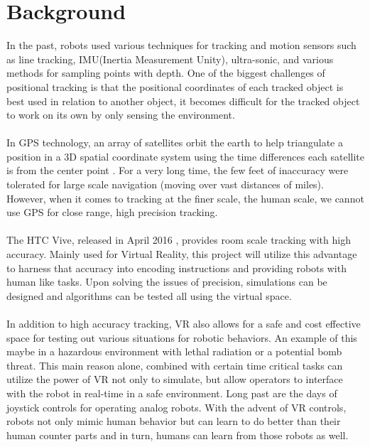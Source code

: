 \documentclass[10pt,a4paper]{article}
\begin{document}
	\section*{Background}
	In the past, robots used various techniques for tracking and motion sensors such as line tracking, IMU(Inertia Measurement Unity), ultra-sonic, and various methods for sampling points with depth. One of the biggest challenges of positional tracking is that the positional coordinates of each tracked object is best used in relation to another object, it becomes difficult for the tracked object to work on its own by only sensing the environment.
	\\\\
	In GPS technology, an array of satellites orbit the earth to help triangulate a position in a 3D spatial coordinate system using the time differences each satellite is from the center point \cite{gizmodo1}. For a very long time, the few feet of inaccuracy were tolerated for large scale navigation (moving over vast distances of miles). However, when it comes to tracking at the finer scale, the human scale, we cannot use GPS for close range, high precision tracking.
	\\\\
	The HTC Vive, released in April 2016 \cite{techradar1}, provides room scale tracking with high accuracy. Mainly used for Virtual Reality, this project will utilize this advantage to harness that accuracy into encoding instructions and providing robots with human like tasks. Upon solving the issues of precision, simulations can be designed and algorithms can be tested all using the virtual space.
	\\\\
	In addition to high accuracy tracking, VR also allows for a safe and cost effective space for testing out various situations for robotic behaviors. An example of this maybe in a hazardous environment\cite{Bugalia} with lethal radiation or a potential bomb threat\cite{Codd-Downey}. This main reason alone, combined with certain time critical tasks can utilize the power of VR not only to simulate, but allow operators to interface with the robot in real-time in a safe environment. Long past are the days of joystick controls for operating analog robots. With the advent of VR controls, robots not only mimic human behavior but can learn to do better than their human counter parts and in turn, humans can learn from those robots as well.
	
\end{document}
